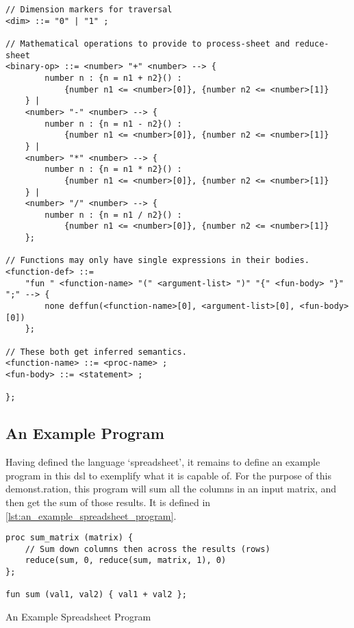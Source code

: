 \begin{verbatim}
// Dimension markers for traversal
<dim> ::= "0" | "1" ;

// Mathematical operations to provide to process-sheet and reduce-sheet
<binary-op> ::= <number> "+" <number> --> {
        number n : {n = n1 + n2}() :
            {number n1 <= <number>[0]}, {number n2 <= <number>[1]}
    } |
    <number> "-" <number> --> {
        number n : {n = n1 - n2}() :
            {number n1 <= <number>[0]}, {number n2 <= <number>[1]}
    } |
    <number> "*" <number> --> {
        number n : {n = n1 * n2}() :
            {number n1 <= <number>[0]}, {number n2 <= <number>[1]}
    } |
    <number> "/" <number> --> {
        number n : {n = n1 / n2}() :
            {number n1 <= <number>[0]}, {number n2 <= <number>[1]}
    };

// Functions may only have single expressions in their bodies. 
<function-def> ::= 
    "fun " <function-name> "(" <argument-list> ")" "{" <fun-body> "}" ";" --> {
        none deffun(<function-name>[0], <argument-list>[0], <fun-body>[0])
    };

// These both get inferred semantics.
<function-name> ::= <proc-name> ;
<fun-body> ::= <statement> ;

};

\end{verbatim}



\subsection{An Example Program} %
\label{sub:an_example_program}
Having  defined the language `spreadsheet', it remains to define an example program in this \gls{dsl} to exemplify what it is capable of.
For the purpose of this demonst.ration, this program will sum all the columns in an input matrix, and then get the sum of those results. 
It is defined in \autoref{lst:an_example_spreadsheet_program}.

\begin{listing}[!htb]
\begin{verbatim}
proc sum_matrix (matrix) {
    // Sum down columns then across the results (rows)
    reduce(sum, 0, reduce(sum, matrix, 1), 0)
};

fun sum (val1, val2) { val1 + val2 };
\end{verbatim}
\caption{An Example Spreadsheet Program}
\label{lst:an_example_spreadsheet_program}
\end{listing}

